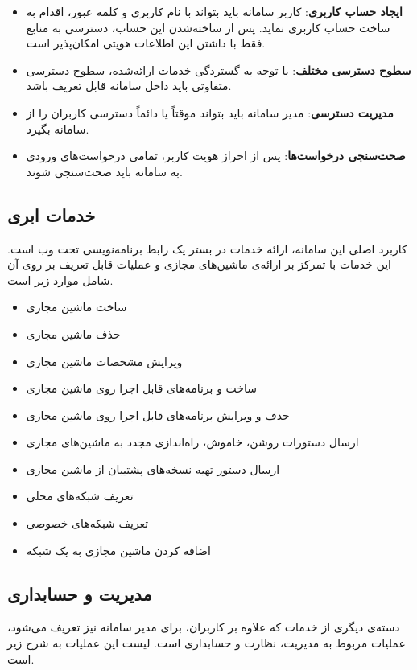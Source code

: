 \begin{itemize}
\item \textbf{ایجاد حساب کاربری}: کاربر سامانه باید بتواند با نام کاربری و کلمه عبور، اقدام به ساخت حساب کاربری نماید. پس از ساخته‌شدن این حساب، دسترسی به منابع فقط با داشتن این اطلاعات هویتی امکان‌پذیر است.

\item \textbf{سطوح دسترسی مختلف}: با توجه به گستردگی خدمات ارائه‌شده، سطوح دسترسی متفاوتی باید داخل سامانه قابل تعریف باشد.

\item \textbf{مدیریت دسترسی}: مدیر سامانه باید بتواند موقتاً یا دائماً دسترسی کاربران را از سامانه بگیرد.

\item \textbf{صحت‌سنجی درخواست‌ها}: پس از احراز هویت کاربر، تمامی درخواست‌های ورودی به سامانه باید صحت‌سنجی شوند.
\end{itemize}

\subsection{خدمات ابری}
کاربرد اصلی این سامانه، ارائه خدمات  در بستر یک رابط برنامه‌نویسی تحت وب است. این خدمات با تمرکز بر ارائه‌ی ماشین‌های مجازی و عملیات قابل تعریف بر روی آن شامل موارد زیر است.

\begin{itemize}
	\item ساخت ماشین مجازی
	\item حذف ماشین مجازی
	\item ویرایش مشخصات ماشین مجازی
	\item ساخت  و برنامه‌های قابل اجرا روی ماشین مجازی
	\item حذف و ویرایش برنامه‌های قابل اجرا روی ماشین مجازی
	\item ارسال دستورات روشن، خاموش، راه‌اندازی مجدد به ماشین‌های مجازی
	\item ارسال دستور تهیه نسخه‌های پشتیبان از ماشین مجازی
	\item تعریف شبکه‌های محلی
	\item تعریف شبکه‌های خصوصی
	\item اضافه کردن ماشین مجازی به یک شبکه
\end{itemize}

\subsection{مدیریت و حسابداری}
دسته‌ی دیگری از خدمات که علاوه بر کاربران، برای مدیر سامانه نیز تعریف می‌شود، عملیات مربوط به مدیریت، نظارت و حسابداری است. لیست این عملیات به شرح زیر است.

